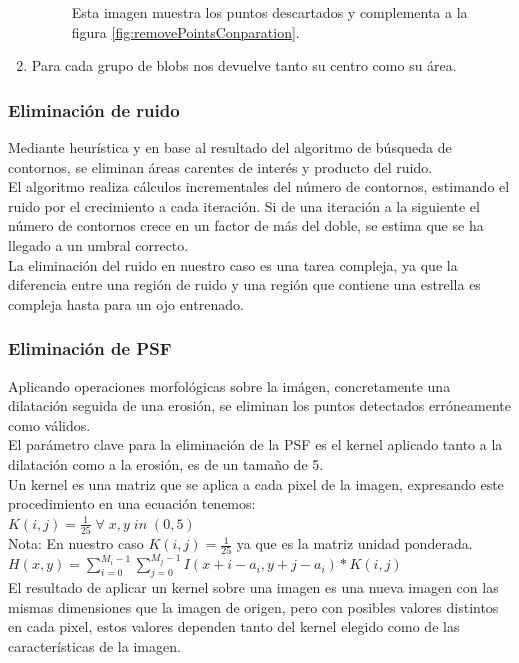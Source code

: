 \begin{enumerate}
\begin{figure}[!htb]
				\caption{\label{fig:removePointsDiference}Esta imagen muestra los puntos descartados y complementa a la figura \ref{fig:removePointsConparation}.}
			\end{figure}		
		\item Para cada grupo de blobs nos devuelve tanto su centro como su área.
	\end{enumerate}

	\subsubsection{Eliminación de ruido}
	Mediante heurística y en base al resultado del algoritmo de búsqueda de contornos, se eliminan áreas carentes de interés y producto del ruido.
	\\El algoritmo realiza cálculos incrementales del número de contornos, estimando el ruido por el crecimiento a cada iteración. Si de una iteración a la siguiente el número de contornos crece en un factor de más del doble, se estima que se ha llegado a un umbral correcto.
	\\
	La eliminación del ruido en nuestro caso es una tarea compleja, ya que la diferencia entre una región de ruido y una región que contiene una estrella es compleja hasta para un ojo entrenado.
	\subsubsection{Eliminación de PSF}
    Aplicando operaciones morfológicas sobre la imágen, concretamente una dilatación seguida de una erosión, se eliminan los puntos detectados erróneamente como válidos.
    \\
    El parámetro clave para la eliminación de la PSF es el kernel aplicado tanto a la dilatación como a la erosión, es de un tamaño de 5.
    \\
    Un kernel es una matriz que se aplica a cada pixel de la imagen, expresando este procedimiento en una ecuación tenemos:\\ \newline
    $ K(i,j) = \frac{1}{25} \; \forall\; x,y \; in \; (0,5)$\\ \newline
    \scriptsize Nota: En nuestro caso $K(i,j)=\frac{1}{25}$ ya que es la matriz unidad ponderada.\\ \newline
    $ H(x,y) = \sum_{i=0}^{M_{i}-1}\sum_{j=0}^{M_{j}-1}I(x+i-a_{i},y+j-a_{i})*K(i,j) $
	\\
	El resultado de aplicar un kernel sobre una imagen es una nueva imagen con las mismas dimensiones que la imagen de origen, pero con posibles valores distintos en cada pixel, estos valores dependen tanto del kernel elegido como de las características de la imagen.
	\\
